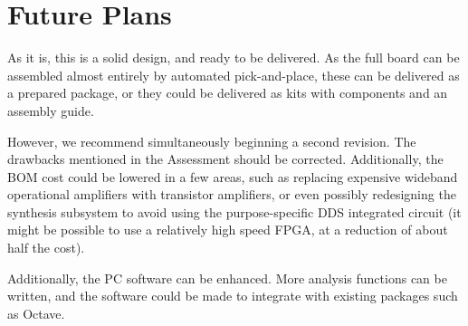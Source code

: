 \chapter{Future Plans}

As it is, this is a solid design, and ready to be delivered. As the full board can
be assembled almost entirely by automated pick-and-place, these can be delivered as
a prepared package, or they could be delivered as kits with components and an
assembly guide.

However, we recommend simultaneously beginning a second revision. The drawbacks
mentioned in the Assessment should be corrected. Additionally, the BOM cost could
be lowered in a few areas, such as replacing expensive wideband operational
amplifiers with transistor amplifiers, or even possibly redesigning the
synthesis subsystem to avoid using the purpose-specific DDS integrated
circuit (it might be possible to use a relatively high speed FPGA, at a
reduction of about half the cost).

Additionally, the PC software can be enhanced. More analysis functions can be
written, and the software could be made to integrate with existing packages such
as Octave.
